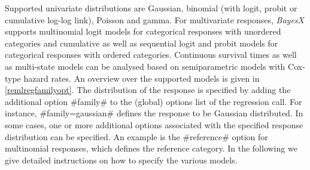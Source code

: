Supported univariate distributions are Gaussian, binomial (with
logit, probit or cumulative log-log link), Poisson and gamma. For
multivariate responses, {\em BayesX} supports multinomial logit
models for categorical responses with unordered categories and
cumulative as well as sequential logit and probit models for
categorical responses with ordered categories. Continuous survival
times as well as multi-state models can be analysed based on
semiparametric models with Cox-type hazard rates. An overview over
the supported models is given in \autoref{remlregfamilyopt}. The
distribution of the response is specified by adding the additional
option #family# to the (global) options list of the regression call.
For instance, #family=gaussian# defines the response to be Gaussian
distributed. In some cases, one or more additional options
associated with the specified response distribution can be
specified. An example is the #reference# option for multinomial
responses, which defines the reference category. In the following we
give detailed instructions on how to specify the various models.

